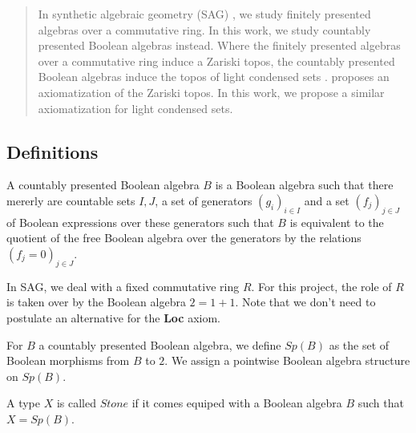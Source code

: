 \begin{abstract}
In synthetic algebraic geometry (SAG) \cite{draft}, we study finitely presented algebras over a commutative ring. 
In this work, we study countably presented Boolean algebras instead. 
Where the finitely presented algebras over a commutative ring induce a Zariski topos, 
the countably presented Boolean algebras induce the topos of light condensed sets \cite{TODO}. 
\cite{draft} proposes an axiomatization of the Zariski topos. 
In this work, we propose a similar axiomatization for light condensed sets. 
\end{abstract} 

\subsection{Definitions}
\begin{definition}
  A countably presented Boolean algebra $B$ is a Boolean algebra such that there mererly are countable sets $I,J$, 
  a set of generators $(g_i)_{i\in I}$ and a set $(f_j)_{j\in J}$ of Boolean expressions over these generators 
  such that $B$ is equivalent to the quotient of the free Boolean algebra over the generators by the relations
  $(f_j=0)_{j\in J}$. 
\end{definition} 


In SAG, we deal with a fixed commutative ring $R$. For this project, the role of $R$ is taken over by 
the Boolean algebra $2 = 1+1$. Note that we don't need to postulate an alternative for the \textbf{Loc} axiom. 


\begin{definition}
  For $B$ a countably presented Boolean algebra, we define $Sp(B)$ as the set of Boolean morphisms from $B$ to $2$. 
  We assign a pointwise Boolean algebra structure on $Sp(B)$. 
\end{definition}

\begin{definition}
  A type $X$ is called $Stone$ if it comes equiped with a Boolean algebra $B$ such that
  $X = Sp(B)$. 
\end{definition}



